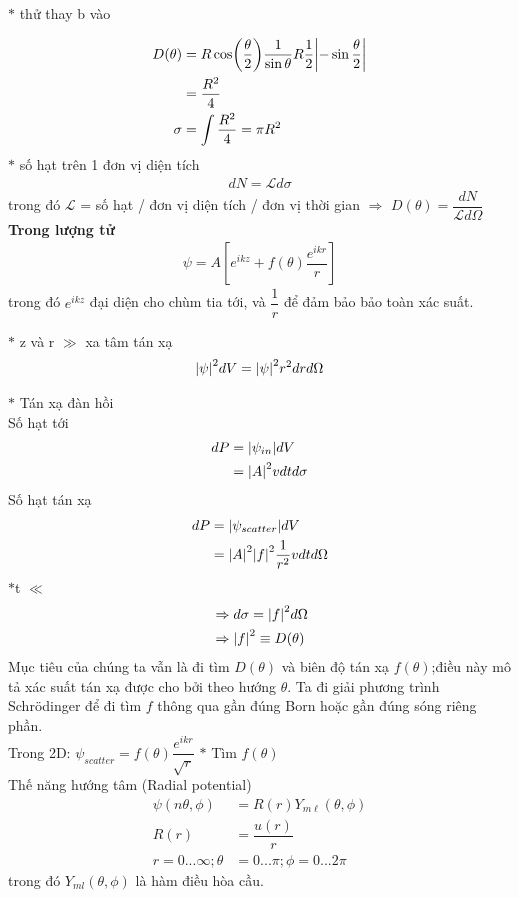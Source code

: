 \documentclass{report}
\renewcommand{\l}{\ell}
\begin{document}
\noindent$\ast$ thử thay b vào

\begin{align*}
	D(\theta) & = R \cos(\dfrac{\theta}{2}) \dfrac{1}{\sin\theta} R \dfrac{1}{2}\abs{-\sin\dfrac{\theta}{2}} \\
	          & = \dfrac{R^2}{4}                                                                             \\
	\sigma    & = \int \dfrac{R^2}{4}= \pi R^2
\end{align*}
$\ast$ số hạt trên 1 đơn vị diện tích
\begin{align*}
	dN = \mathcal{L}d\sigma
\end{align*}
trong đó $\mathcal{L}$ = số hạt / đơn vị diện tích / đơn vị thời gian $\Rightarrow$ $D(\theta) = \dfrac{dN}{\mathcal{L}d\Omega}$\\
\textbf{Trong lượng tử}
\begin{align}
	\psi = A \left[e^{ikz} + f(\theta)\dfrac{e^{ikr}}{r}\right]
\end{align}
trong đó $e^{ikz}$ đại diện cho chùm tia tới, và $\dfrac{1}{r}$ để đảm bảo bảo toàn xác suất.

$\ast$ z và r $\gg$ xa tâm tán xạ
\begin{align*}
	\abs{\psi}^2d{V} = \abs{\psi}^2r^2d {r} d\Omega
\end{align*}




$\ast$ Tán xạ đàn hồi\\
Số hạt tới
\begin{align*}
	dP & = \abs{\psi_{in}}d{V} \\
	   & = \abs{A}^2vdtd\sigma
\end{align*}
Số hạt tán xạ
\begin{align*}
	dP & = \abs{\psi_{scatter}}d{V}                   \\
	   & = \abs{A}^2\abs{f}^2\dfrac{1}{r^2}vdtd\Omega
\end{align*}
$\ast$t $\ll$
\begin{align*}
	 & \Rightarrow d\sigma = \abs{f}^2d\Omega \\
	 & \Rightarrow \abs{f}^2 \equiv D(\theta)
\end{align*}
Mục tiêu của chúng ta vẫn là đi tìm $D(\theta)$ và biên độ tán xạ $f(\theta)$;điều này mô tả xác suất tán xạ được cho bởi theo hướng $\theta$. Ta đi giải phương trình Schr\"{o}dinger để đi tìm $f$ thông qua gần đúng Born hoặc gần đúng sóng riêng phần.\\
Trong 2D: $\psi_{scatter} = f(\theta)\dfrac{e^{ik{r}}}{\sqrt{{r}}}$
\clearpage
$\ast$ Tìm $f(\theta)$\\
Thế năng hướng tâm (Radial potential)
\begin{align*}
	\psi(n\theta,\phi)      & =R({r})Y_{m\l}(\theta,\phi) \\
	R({r})                  & =\dfrac{u({r})}{{r}}        \\
	{r} =0...\infty ;\theta & = 0...\pi;\phi = 0...2\pi
\end{align*}
trong đó $Y_{ml}(\theta,\phi)$ là hàm điều hòa cầu.
\end{document}
